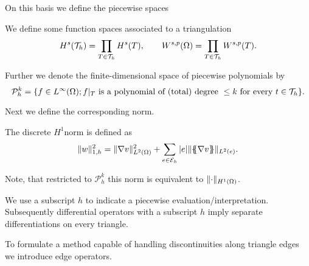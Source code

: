 On this basis we define the piecewise spaces
\begin{definition}
We define some function spaces associated to a triangulation
\begin{align}
	H^s(\mathcal{T}_h) = \prod\limits_{T\in \mathcal{T}_h}  H^s(T), \qquad W^{s,p}(\Omega) = \prod\limits_{T\in \mathcal{T}_h} W^{s,p}(T).
\end{align}	
\end{definition}

\begin{definition} \label{def: piecewise polySpace}
	Further we denote the finite-dimensional space of piecewise polynomials by
\[	
	\mathcal P^k_h = \{ f \in L^\infty(\Omega); f \arrowvert_T \textnormal{ is a polynomial of (total) degree } \leq k \textnormal{ for every } t \in \mathcal T_h\}.
\]
\end{definition}
Next we define the corresponding norm.
\begin{definition} \label{def: discrete h1 norm}
	The discrete $H^1$norm is defined as 
\[	
		\lVert w \rVert_{1,h} ^2 = \lVert \nabla v  \rVert_{L^2(\Omega)}^2 + \sum_{e \in \mathcal{E}_h} |e| \lVert \{\!\!\{ \nabla v  \}\!\!\} \rVert_{L^2(e)}.
\]
\end{definition}
Note, that restricted to $\mathcal P^k_h$ this norm is equivalent to $\lVert \cdot \rVert_{H^1(\Omega)}$.


We use a subscript $h$ to indicate a piecewise evaluation/interpretation. Subsequently differential operators with a subscript $h$ imply separate differentiations on every triangle.

To formulate a method capable of handling discontinuities along triangle edges we introduce edge operators.   

